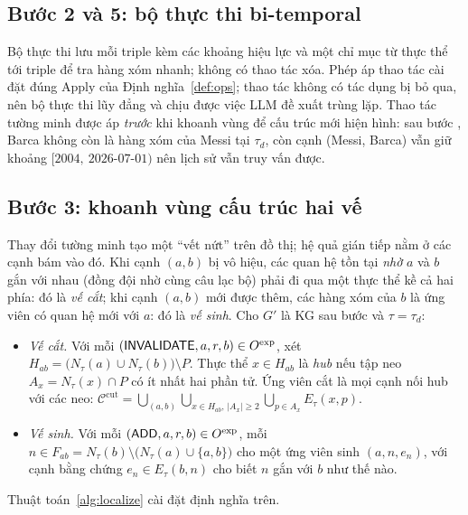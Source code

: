 \subsection{Bước 2 và 5: bộ thực thi bi-temporal}\label{sec:step-exec}

Bộ thực thi lưu mỗi triple kèm các khoảng hiệu lực và một chỉ mục từ thực thể tới triple để tra hàng xóm nhanh; không có thao tác xóa.
Phép áp thao tác cài đặt đúng $\mathrm{Apply}$ của Định nghĩa~\ref{def:ops}; thao tác không có tác dụng bị bỏ qua, nên bộ thực thi lũy đẳng và chịu được việc LLM đề xuất trùng lặp.
Thao tác tường minh được áp \emph{trước} khi khoanh vùng để cấu trúc mới hiện hình: sau bước , Barca không còn là hàng xóm của Messi tại $\tau_d$, còn cạnh (Messi, Barca) vẫn giữ khoảng $[2004,\ \text{2026-07-01})$ nên lịch sử vẫn truy vấn được.

\subsection{Bước 3: khoanh vùng cấu trúc hai vế}\label{sec:step-localize}

Thay đổi tường minh tạo một ``vết nứt'' trên đồ thị; hệ quả gián tiếp nằm ở các cạnh bám vào đó.
Khi cạnh $(a,b)$ bị vô hiệu, các quan hệ tồn tại \emph{nhờ} $a$ và $b$ gắn với nhau (đồng đội nhờ cùng câu lạc bộ) phải đi qua một thực thể kề cả hai phía: đó là \emph{vế cắt}; khi cạnh $(a,b)$ mới được thêm, các hàng xóm của $b$ là ứng viên có quan hệ mới với $a$: đó là \emph{vế sinh}.
Cho $G'$ là KG sau bước  và $\tau=\tau_d$:
\begin{itemize}
\item \emph{Vế cắt.} Với mỗi $(\textsf{INVALIDATE},a,r,b)\in O^{\mathrm{exp}}$, xét $H_{ab}=\bigl(N_\tau(a)\cup N_\tau(b)\bigr)\setminus P$. Thực thể $x\in H_{ab}$ là \emph{hub} nếu tập neo $A_x=N_\tau(x)\cap P$ có ít nhất hai phần tử. Ứng viên cắt là mọi cạnh nối hub với các neo: $\mathcal{C}^{\mathrm{cut}}=\bigcup_{(a,b)}\bigcup_{x\in H_{ab},\,|A_x|\ge 2}\bigcup_{p\in A_x}E_\tau(x,p)$.
\item \emph{Vế sinh.} Với mỗi $(\textsf{ADD},a,r,b)\in O^{\mathrm{exp}}$, mỗi $n\in F_{ab}=N_\tau(b)\setminus\bigl(N_\tau(a)\cup\{a,b\}\bigr)$ cho một ứng viên sinh $(a,n,e_n)$, với cạnh bằng chứng $e_n\in E_\tau(b,n)$ cho biết $n$ gắn với $b$ như thế nào.
\end{itemize}
Thuật toán~\ref{alg:localize} cài đặt định nghĩa trên.


